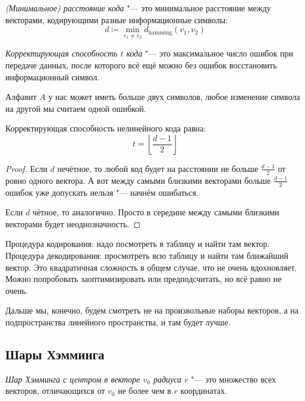 \begin{Def}
	\textit{(Минимальное) расстояние кода} "--- это минимальное расстояние между
	векторами, кодирующими разные информационные символы:
	\[
		d \coloneqq \min_{v_1 \neq v_2} d_\text{hamming}(v_1, v_2)
	\]
\end{Def}
\begin{Def}
	\textit{Корректирующая способность $t$ кода} "--- это максимальное число ошибок при передаче
	данных, после которого всё ещё можно без ошибок восстановить информационный символ.
\end{Def}
\begin{Rem}
	Алфавит $A$ у нас может иметь больше двух символов, любое изменение символа на другой мы считаем одной ошибкой.
\end{Rem}
\begin{Exercise}
	Корректирующая способность нелинейного кода равна:
	\[
		t = \left\lfloor \frac{d - 1}{2} \right\rfloor
	\]
\end{Exercise}
\begin{proof}
	Если $d$ нечётное, то любой код будет на расстоянии не больше $\frac{d-1}{2}$ от ровно одного вектора.
	А вот между самыми близкими векторами больше $\frac{d-1}{2}$ ошибок уже допускать нельзя "--- начнём ошибаться.

	Если $d$ чётное, то аналогично.
	Просто в середине между самыми близкими векторами будет неоднозначность.
\end{proof}

Процедура кодирования: надо посмотреть в таблицу и найти там вектор.
Процедура декодирования: просмотреть всю таблицу и найти там ближайший вектор.
Это квадратичная сложность в общем случае, что не очень вдохновляет.
Можно попробовать заоптимизировать или предподсчитать, но всё равно не очень.

Дальше мы, конечно, будем смотреть не на произвольные наборы векторов, а на подпространства линейного пространства, и там будет лучше.

\subsection{Шары Хэмминга}
\begin{Def}
	\textit{Шар Хэмминга с центром в векторе $v_0$ радиуса $r$} "--- это множество всех векторов, отличающихся
	от $v_0$ не более чем в $r$ координатах.
\end{Def}

